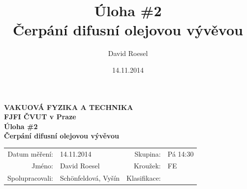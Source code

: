 \documentclass[english]{article}
\newcommand{\Author}{David Roesel}
\newcommand{\Coauthor}{Schönfeldová, Vyšín}
\newcommand{\Institute}{FJFI ČVUT v Praze}
\newcommand{\Subject}{VAKUOVÁ FYZIKA A TECHNIKA}
\newcommand{\Group}{Pá 14:30}
\newcommand{\Kruh}{FE}
\newcommand{\Title}{Úloha \#2  \\Čerpání difusní olejovou vývěvou}
\newcommand{\Date}{14.11.2014}
\begin{document}
\author{\Author}
\title{\Title}
\date{\Date}

\renewcommand{\figurename}{Obr.}
\renewcommand{\tablename}{Tab.}
\renewcommand{\refname}{Reference}


\setlength{\parindent}{0cm}
\begin{multicols}{2}
\textbf{\Subject \\
        \Institute \\[0.1cm]
\Title \\[0.5cm]
}
\begin{tabular}{rlrl}
\large Datum měření: & \Date & \large Skupina: & \Group \\
\large Jméno: & \Author & \large Kroužek:  & \Kruh\\
\large Spolupracovali: & \Coauthor &\large Klasifikace:\\
\end{tabular}


\end{multicols}
\end{document}
